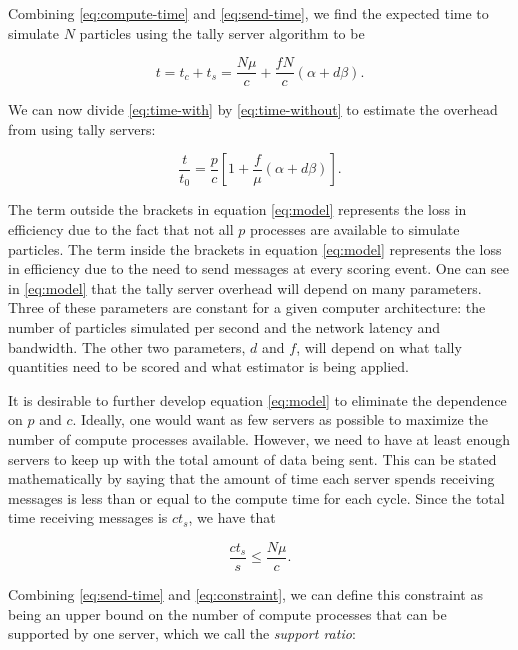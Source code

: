 \documentclass[3p]{elsarticle}
\begin{document}
\noindent Combining \eqref{eq:compute-time} and \eqref{eq:send-time}, we find
the expected time to simulate $N$ particles using the tally server algorithm to
be

\begin{equation}
  \label{eq:time-with}
  t = t_c + t_s = \frac{N\mu}{c} + \frac{fN}{c} \left ( \alpha + d\beta \right
  ).
\end{equation}

\noindent We can now divide \eqref{eq:time-with} by \eqref{eq:time-without} to
estimate the overhead from using tally servers:

\begin{equation}
  \label{eq:model}
  \frac{t}{t_0} = \frac{p}{c} \left[ 1 + \frac{f}{\mu} \left ( \alpha + d\beta
    \right ) \right ].
\end{equation}

\noindent The term outside the brackets in equation \eqref{eq:model} represents
the loss in efficiency due to the fact that not all $p$ processes are available
to simulate particles. The term inside the brackets in equation \eqref{eq:model}
represents the loss in efficiency due to the need to send messages at every
scoring event. One can see in \eqref{eq:model} that the tally server overhead
will depend on many parameters. Three of these parameters are constant for a
given computer architecture: the number of particles simulated per second and
the network latency and bandwidth. The other two parameters, $d$ and $f$, will
depend on what tally quantities need to be scored and what estimator is being
applied.

It is desirable to further develop equation \eqref{eq:model} to eliminate the
dependence on $p$ and $c$. Ideally, one would want as few servers as possible to
maximize the number of compute processes available. However, we need to have at
least enough servers to keep up with the total amount of data being sent. This
can be stated mathematically by saying that the amount of time each server
spends receiving messages is less than or equal to the compute time for each
cycle. Since the total time receiving messages is $ct_s$, we have that

\begin{equation}
  \label{eq:constraint}
  \frac{ct_s}{s} \le \frac{N\mu}{c}.
\end{equation}

\noindent Combining \eqref{eq:send-time} and \eqref{eq:constraint}, we can
define this constraint as being an upper bound on the number of compute
processes that can be supported by one server, which we call the {\em support
  ratio}:
\end{document}
